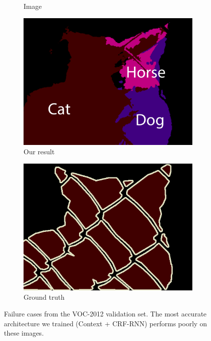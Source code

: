 \documentclass{article} %
\begin{document}
\begin{figure}[b]
\begin{subfigure}[b]{0.15\linewidth}
    \caption{Image}
  \end{subfigure}
  \begin{subfigure}[b]{0.15\linewidth}
    \includegraphics[width=\textwidth]{figs/ab/crf/2010_005508}
    \captionsetup{labelformat=empty}
    \vspace{-0.2in}
    \caption{Our result}
  \end{subfigure}
  \begin{subfigure}[b]{0.15\linewidth}
    \includegraphics[width=\textwidth]{figs/ab/gt/2010_005508}
    \captionsetup{labelformat=empty}
    \vspace{-0.2in}
    \caption{Ground truth}
  \end{subfigure}

  \vspace{-1mm}
  \caption{Failure cases from the VOC-2012 validation set. The most accurate architecture we trained (Context + CRF-RNN) performs poorly on these images.}
  \label{fig:failure}
  \end{figure}

{\small

   \setlength{\bibsep}{6pt}
   \linespread{1}\selectfont

}

\newpage


\end{document}
